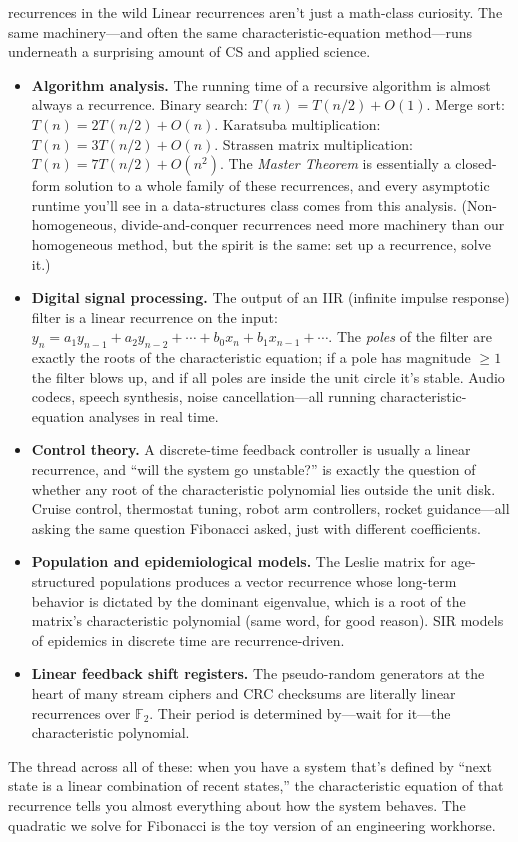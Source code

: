 \documentclass[11pt]{article}
\begin{document}
\begin{sidebar}{recurrences in the wild}
Linear recurrences aren't just a math-class curiosity. The same machinery---and often the same characteristic-equation method---runs underneath a surprising amount of CS and applied science.

\begin{itemize}
  \item \textbf{Algorithm analysis.} The running time of a recursive algorithm is almost always a recurrence. Binary search: $T(n) = T(n/2) + O(1)$. Merge sort: $T(n) = 2T(n/2) + O(n)$. Karatsuba multiplication: $T(n) = 3T(n/2) + O(n)$. Strassen matrix multiplication: $T(n) = 7T(n/2) + O(n^2)$. The \emph{Master Theorem} is essentially a closed-form solution to a whole family of these recurrences, and every asymptotic runtime you'll see in a data-structures class comes from this analysis. (Non-homogeneous, divide-and-conquer recurrences need more machinery than our homogeneous method, but the spirit is the same: set up a recurrence, solve it.)
  \item \textbf{Digital signal processing.} The output of an IIR (infinite impulse response) filter is a linear recurrence on the input: $y_n = a_1 y_{n-1} + a_2 y_{n-2} + \cdots + b_0 x_n + b_1 x_{n-1} + \cdots$. The \emph{poles} of the filter are exactly the roots of the characteristic equation; if a pole has magnitude $\geq 1$ the filter blows up, and if all poles are inside the unit circle it's stable. Audio codecs, speech synthesis, noise cancellation---all running characteristic-equation analyses in real time.
  \item \textbf{Control theory.} A discrete-time feedback controller is usually a linear recurrence, and ``will the system go unstable?'' is exactly the question of whether any root of the characteristic polynomial lies outside the unit disk. Cruise control, thermostat tuning, robot arm controllers, rocket guidance---all asking the same question Fibonacci asked, just with different coefficients.
  \item \textbf{Population and epidemiological models.} The Leslie matrix for age-structured populations produces a vector recurrence whose long-term behavior is dictated by the dominant eigenvalue, which is a root of the matrix's characteristic polynomial (same word, for good reason). SIR models of epidemics in discrete time are recurrence-driven.
  \item \textbf{Linear feedback shift registers.} The pseudo-random generators at the heart of many stream ciphers and CRC checksums are literally linear recurrences over $\mathbb{F}_2$. Their period is determined by---wait for it---the characteristic polynomial.
\end{itemize}

The thread across all of these: when you have a system that's defined by ``next state is a linear combination of recent states,'' the characteristic equation of that recurrence tells you almost everything about how the system behaves. The quadratic we solve for Fibonacci is the toy version of an engineering workhorse.
\end{sidebar}
\end{document}
